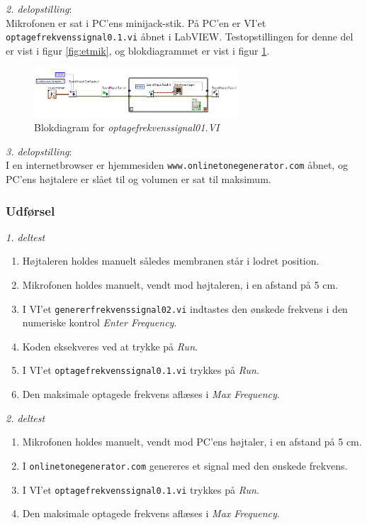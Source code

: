 		\textit{2. delopstilling}:\\
		Mikrofonen er sat i PC'ens minijack-stik. På PC'en er VI'et \texttt{optagefrekvenssignal0.1.vi} åbnet i LabVIEW. Testopstillingen for denne del er vist i figur \ref{fig:etmik}, og blokdiagrammet er vist i figur \ref{fig:3of01}.\\  

		\begin{figure}[htb]
			\centering
				\includegraphics[width=3in]{of01}
				\caption{Blokdiagram for \textit{optagefrekvenssignal01.VI}}	
				\label{fig:3of01}
			\end{figure}		
		
		\textit{3. delopstilling}:\\
		I en internetbrowser er hjemmesiden \texttt{www.onlinetonegenerator.com} åbnet, og PC'ens højtalere er slået til og volumen er sat til maksimum. 
		
		\subsubsection{Udførsel}
			
			\textit{1. deltest}
			\begin{enumerate}
				\item Højtaleren holdes manuelt således membranen står i lodret position. 
				\item Mikrofonen holdes manuelt, vendt mod højtaleren, i en afstand på 5 cm. 
				\item I VI'et \texttt{genererfrekvenssignal02.vi} indtastes den ønskede frekvens i den numeriske kontrol \textit{Enter Frequency}. 
					
					\item Koden eksekveres ved at trykke på \textit{Run}. 
				
				\item I VI'et \texttt{optagefrekvenssignal0.1.vi} trykkes på \textit{Run}. 
					
				\item Den maksimale optagede frekvens aflæses i \textit{Max Frequency}. 
				
			\end{enumerate}
			
			
			\textit{2. deltest}			
			\begin{enumerate}
				\item Mikrofonen holdes manuelt, vendt mod PC'ens højtaler, i en afstand på 5 cm. 
				\item I \texttt{onlinetonegenerator.com} genereres et signal med den ønskede frekvens. 
				\item I VI'et \texttt{optagefrekvenssignal0.1.vi} trykkes på \textit{Run}. 
					
						\item Den maksimale optagede frekvens aflæses i \textit{Max Frequency}. 
					  
			\end{enumerate}
		
